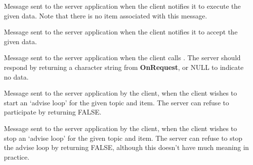 \label{wxconnectiononexecute}


Message sent to the server application when the client notifies it to
execute the given data. Note that there is no item associated with
this message.

\label{wxconnectiononpoke}


Message sent to the server application when the client notifies it to
accept the given data.

\label{wxconnectiononrequest}


Message sent to the server application when the client
calls . The server
should respond by returning a character string from {\bf OnRequest},
or NULL to indicate no data.

\label{wxconnectiononstartadvise}


Message sent to the server application by the client, when the client
wishes to start an `advise loop' for the given topic and item. The
server can refuse to participate by returning FALSE.

\label{wxconnectiononstopadvise}


Message sent to the server application by the client, when the client
wishes to stop an `advise loop' for the given topic and item. The
server can refuse to stop the advise loop by returning FALSE, although
this doesn't have much meaning in practice.

\label{wxconnectionpoke}


